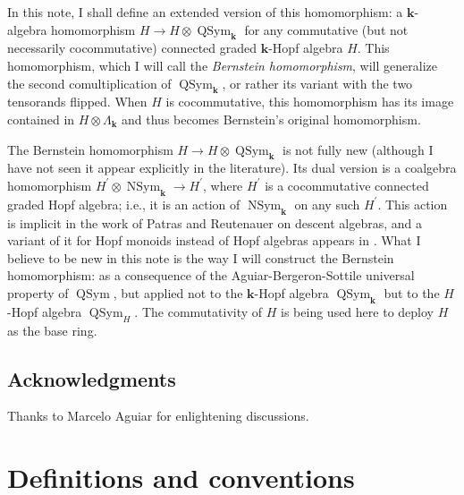 \documentclass[numbers=enddot,12pt,final,onecolumn,notitlepage,abstracton]{scrartcl}%
\theoremstyle{definition}
\begin{document}
In this note, I shall define an extended version of this homomorphism: a
$\mathbf{k}$-algebra homomorphism $H\rightarrow H\otimes\operatorname*{QSym}%
\nolimits_{\mathbf{k}}$ for any commutative (but not necessarily
cocommutative) connected graded $\mathbf{k}$-Hopf algebra $H$. This
homomorphism, which I will call the \textit{Bernstein homomorphism}, will
generalize the second comultiplication of $\operatorname*{QSym}%
\nolimits_{\mathbf{k}}$, or rather its variant with the two tensorands
flipped. When $H$ is cocommutative, this homomorphism has its image contained
in $H\otimes\Lambda_{\mathbf{k}}$ and thus becomes Bernstein's original homomorphism.

The Bernstein homomorphism $H\rightarrow H\otimes\operatorname*{QSym}%
\nolimits_{\mathbf{k}}$ is not fully new (although I have not seen it appear
explicitly in the literature). Its dual version is a coalgebra homomorphism
$H^{\prime}\otimes\operatorname*{NSym}\nolimits_{\mathbf{k}}\rightarrow
H^{\prime}$, where $H^{\prime}$ is a cocommutative connected graded Hopf
algebra; i.e., it is an action of $\operatorname*{NSym}\nolimits_{\mathbf{k}}$
on any such $H^{\prime}$. This action is implicit in the work of Patras and
Reutenauer on descent algebras, and a variant of it for Hopf monoids instead
of Hopf algebras appears in \cite[Propositions 84 and 88, and especially the
Remark after Proposition 88]{Aguiar13}. What I believe to be new in this note
is the way I will construct the Bernstein homomorphism: as a consequence of
the Aguiar-Bergeron-Sottile universal property of $\operatorname*{QSym}$, but
applied not to the $\mathbf{k}$-Hopf algebra $\operatorname*{QSym}%
\nolimits_{\mathbf{k}}$ but to the $H$-Hopf algebra $\operatorname*{QSym}%
\nolimits_{H}$. The commutativity of $H$ is being used here to deploy $H$ as
the base ring.

\subsection*{Acknowledgments}

Thanks to Marcelo Aguiar for enlightening discussions.

\section{Definitions and conventions}
\end{document}
